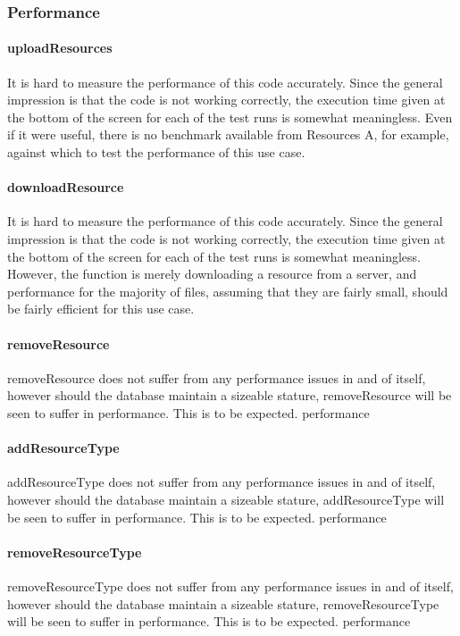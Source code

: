 \documentclass[a4paper]{article}
\begin{document}
\subsubsection {Performance}

\paragraph{uploadResources}
It is hard to measure the performance of this code accurately. Since the general impression is that the code is not working correctly, the execution time given at the bottom of the screen for each of the test runs is somewhat meaningless. Even if it were useful, there is no benchmark available from Resources A, for example, against which to test the performance of this use case.

\paragraph{downloadResource}
It is hard to measure the performance of this code accurately. Since the general impression is that the code is not working correctly, the execution time given at the bottom of the screen for each of the test runs is somewhat meaningless. However, the function is merely downloading a resource from a server, and performance for the majority of files, assuming that they are fairly small, should be fairly efficient for this use case.

\paragraph{removeResource}
removeResource does not suffer from any performance issues in and of itself, however should the database maintain a sizeable stature, removeResource will be seen to suffer in performance. This is to be expected.
performance

\paragraph{addResourceType}
addResourceType does not suffer from any performance issues in and of itself, however should the database maintain a sizeable stature, addResourceType will be seen to suffer in performance. This is to be expected.
performance

\paragraph{removeResourceType}
removeResourceType does not suffer from any performance issues in and of itself, however should the database maintain a sizeable stature, removeResourceType will be seen to suffer in performance. This is to be expected.
performance
\end{document}
